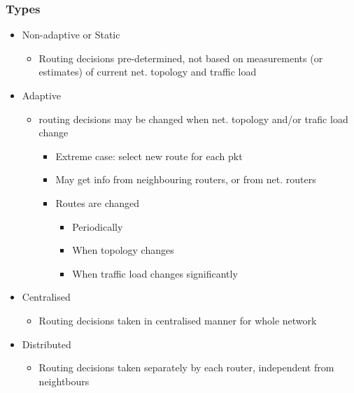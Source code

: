 \documentclass[a4paper]{article}
\begin{document}
\subsubsection{Types}
\begin{itemize}
	\item Non-adaptive or Static
	\begin{itemize}
		\item Routing decisions pre-determined, not based on
			measurements (or estimates) of current net. topology and
			traffic load
	\end{itemize}
	\item Adaptive
	\begin{itemize}
		\item routing decisions may be changed when net. topology and/or
			trafic load change
		\begin{itemize}
			\item Extreme case: select new route for each pkt
			\item May get info from neighbouring routers, or from
				net. routers
			\item Routes are changed
			\begin{itemize}
				\item Periodically
				\item When topology changes
				\item When traffic load changes significantly
			\end{itemize}
		\end{itemize}
	\end{itemize}
	\item Centralised
	\begin{itemize}
		\item Routing decisions taken in centralised manner for whole
			network
	\end{itemize}
	\item Distributed
	\begin{itemize}
		\item Routing decisions taken separately by each router,
			independent from neightbours
	\end{itemize}
\end{itemize}
\end{document}
